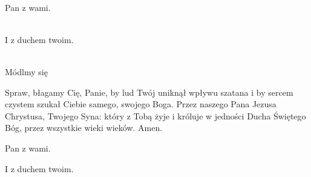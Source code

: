 \newcommand{\dominusvobiscum}{
  \rubric{\Vbar}Pan z wami.
}
\newcommand{\etcumspiritutuo}{
  \rubric{\Rbar}I z duchem twoim.
}

\\
\dominusvobiscum
\\
\etcumspiritutuo
\\
Módlmy się

Spraw, błagamy Cię, Panie, by lud Twój uniknął wpływu szatana i by sercem czystem szukał Ciebie samego, swojego Boga. Przez naszego Pana Jezusa Chrystusa, Twojego Syna: który z Tobą żyje i króluje w jedności Ducha Świętego Bóg, przez wszystkie wieki wieków.\rubric{\Rbar} Amen.

\dominusvobiscum

\etcumspiritutuo
